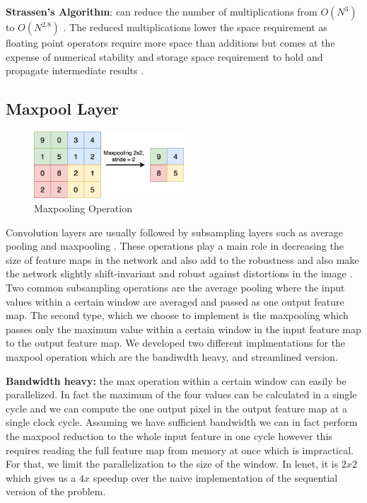 \textbf{Strassen's Algorithm}\cite{cong2014minimizing}: can reduce the number of multiplications from $O(N^3)$ to $O(N^{2.8})$\cite{sze2017efficient} . The reduced multiplications lower the space requirement as floating point operators require more space than additions but comes at the expense of numerical stability and storage space requirement to hold and propagate intermediate results \cite{sze2017efficient}.

\subsection{Maxpool Layer}

\begin{figure}[h!]
\centering
\includegraphics[width=0.5\textwidth]{Figures/maxpool}
\decoRule
\caption[maxpool]{ Maxpooling Operation}
\label{fig:maxpool}
\end{figure}

Convolution layers are usually followed by subsampling layers such as average pooling and maxpooling \cite{lenet}. These operations play a main role in decreasing the size of feature maps in the network and also add to the robustness and also make the network slightly shift-invariant and robust against distortions in the image \cite{alexnet}. Two common subsampling operations are the average pooling where the input values within a certain window are averaged and passed as one output feature map. The second type, which we choose to implement is the maxpooling which passes only the maximum value within a certain window in the input feature map to the output feature map. We developed two different implmentations for the maxpool operation which are the bandiwdth heavy, and streamlined version. 

\textbf{Bandwidth heavy:} the max operation within a certain window can easily be parallelized. In fact the maximum of the four values can be calculated in a single cycle and we can compute the one output pixel in the output feature map at a single clock cycle. Assuming we have sufficient bandwidth we can in fact perform the maxpool reduction to the whole input feature in one cycle however this requires reading the full feature map from memory at once which is impractical. For that, we limit the parallelization to the size of the window. In lenet, it is $ 2x2 $ which gives us a $ 4x $ speedup over the naive implementation of the sequential version of the problem. 

